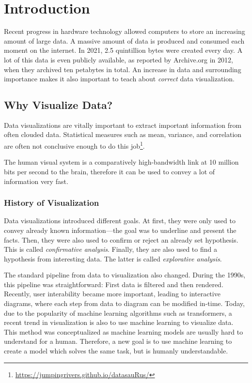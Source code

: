 \chapter{Introduction}
Recent progress in hardware technology allowed computers to store an increasing amount of large data.
A massive amount of data is produced and consumed each moment on the internet.
In 2021, 2.5 quintillion bytes were created every day.
A lot of this data is even publicly available, as reported by Archive.org in 2012, when they archived ten petabytes in total.
An increase in data and surrounding importance makes it also important to teach about \emph{correct} data visualization.

\section{Why Visualize Data?}
Data visualizations are vitally important to extract important information from often clouded data.
Statistical measures such as mean, variance, and correlation are often not conclusive enough to do this job\footnote{\url{https://jumpingrivers.github.io/datasauRus/}}.

The human visual system is a comparatively high-bandwidth link at 10 million bits per second to the brain, therefore it can be used to convey a lot of information very fast.

\subsection{History of Visualization}
Data visualizations introduced different goals.
At first, they were only used to convey already known information---the goal was to underline and present the facts.
Then, they were also used to confirm or reject an already set hypothesis.
This is called \emph{confirmative analysis}.
Finally, they are also used to find a hypothesis from interesting data.
The latter is called \emph{explorative analysis}.

The standard pipeline from data to visualization also changed.
During the 1990s, this pipeline was straightforward: First data is filtered and then rendered.
Recently, user interability became more important, leading to interactive diagrams, where each step from data to diagram can be modified in-time.
Today, due to the popularity of machine learning algorithms such as transformers, a recent trend in visualization is also to use machine learning to visualize data.
This method was conceptualized as machine learning models are usually hard to understand for a human.
Therefore, a new goal is to use machine learning to create a model which solves the same task, but is humanly understandable.
